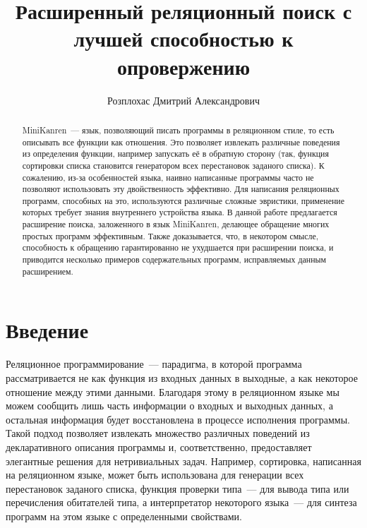 \title{Расширенный реляционный поиск с лучшей способностью к опровержению}
\author{Розплохас Дмитрий Александрович}
\maketitle
  
  \begin{abstract}
    MiniKanren~--- язык, позволяющий писать программы в реляционном стиле, то есть описывать все функции как отношения. Это позволяет извлекать различные поведения из определения функции, например запускать её в обратную сторону (так, функция сортировки списка становится генератором всех перестановок заданого списка). К сожалению, из-за особенностей языка, наивно написанные программы часто не позволяют использовать эту двойственность эффективно. Для написания реляционных программ, способных на это, используются различные сложные эвристики, применение которых требует знания внутреннего устройства языка. В данной работе предлагается расширение поиска, заложенного в язык MiniKanren, делающее обращение многих простых программ эффективным. Также доказывается, что, в некотором смысле, способность к обращению гарантированно не ухудшается при расширении поиска, и приводится несколько примеров содержательных программ, исправляемых данным расширением.
  \end{abstract}
  
  \section*{Введение}
  
    Реляционное программирование~--- парадигма, в которой программа рассматривается не как функция из входных данных в выходные, а как некоторое отношение между этими данными. Благодаря этому в реляционном языке мы можем сообщить лишь часть информации о входных и выходных данных, а остальная информация будет восстановлена в процессе исполнения программы. Такой подход позволяет извлекать множество различных поведений из декларативного описания программы и, соответственно, предоставляет элегантные решения для нетривиальных задач. Например, сортировка, написанная на реляционном языке, может быть использована для генерации всех перестановок заданого списка, функция проверки типа~--- для вывода типа или перечисления обитателей типа, а интерпретатор некоторого языка~--- для синтеза программ на этом языке с определенными свойствами.

